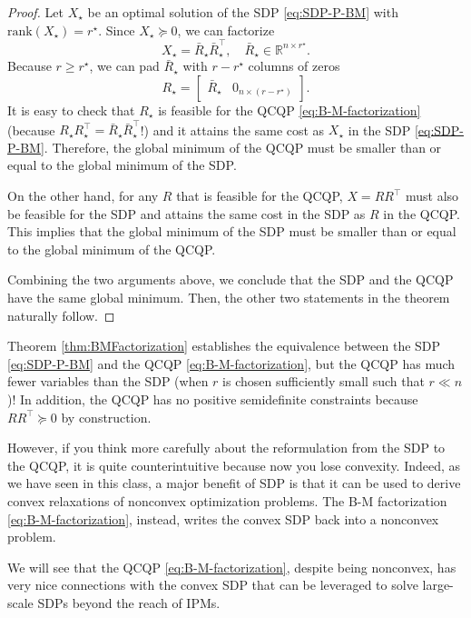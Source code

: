 \documentclass[
]{book}
\theoremstyle{definition}
\theoremstyle{definition}
\theoremstyle{definition}
\theoremstyle{definition}
\theoremstyle{remark}
\begin{document}
\begin{proof}
Let \(X_\star\) be an optimal solution of the SDP \eqref{eq:SDP-P-BM} with \(\mathrm{rank}(X_\star) = r^\star\). Since \(X_\star \succeq 0\), we can factorize
\[
X_\star = \bar{R}_\star \bar{R}_\star^\top, \quad \bar{R}_\star \in \mathbb{R}^{n \times r^\star}.
\]
Because \(r \geq r^\star\), we can pad \(\bar{R}_\star\) with \(r-r^\star\) columns of zeros
\[
R_\star = \begin{bmatrix}
\bar{R}_\star & 0_{n \times (r - r^\star)}
\end{bmatrix}.
\]
It is easy to check that \(R_\star\) is feasible for the QCQP \eqref{eq:B-M-factorization} (because \(R_\star R_\star^\top= \bar{R}_\star \bar{R}_\star^\top\)!) and it attains the same cost as \(X_\star\) in the SDP \eqref{eq:SDP-P-BM}. Therefore, the global minimum of the QCQP must be smaller than or equal to the global minimum of the SDP.

On the other hand, for any \(R\) that is feasible for the QCQP, \(X=RR^\top\) must also be feasible for the SDP and attains the same cost in the SDP as \(R\) in the QCQP. This implies that the global minimum of the SDP must be smaller than or equal to the global minimum of the QCQP.

Combining the two arguments above, we conclude that the SDP and the QCQP have the same global minimum. Then, the other two statements in the theorem naturally follow.
\end{proof}

Theorem \ref{thm:BMFactorization} establishes the equivalence between the SDP \eqref{eq:SDP-P-BM} and the QCQP \eqref{eq:B-M-factorization}, but the QCQP has much fewer variables than the SDP (when \(r\) is chosen sufficiently small such that \(r \ll n\))! In addition, the QCQP has no positive semidefinite constraints because \(RR^\top\succeq 0\) by construction.

However, if you think more carefully about the reformulation from the SDP to the QCQP, it is quite counterintuitive because now you lose convexity. Indeed, as we have seen in this class, a major benefit of SDP is that it can be used to derive convex relaxations of nonconvex optimization problems. The B-M factorization \eqref{eq:B-M-factorization}, instead, writes the convex SDP back into a nonconvex problem.

We will see that the QCQP \eqref{eq:B-M-factorization}, despite being nonconvex, has very nice connections with the convex SDP that can be leveraged to solve large-scale SDPs beyond the reach of IPMs.
\end{document}
